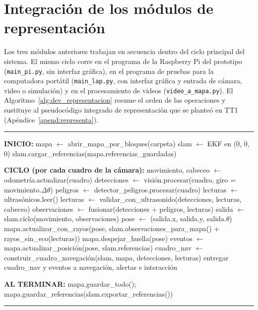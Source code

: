 \section{Integración de los módulos de representación}
\label{sec:dev_integracion}

Los tres módulos anteriores trabajan en secuencia dentro del ciclo principal del
sistema. El mismo ciclo corre en el programa de la Raspberry Pi del prototipo
(\texttt{main\_pi.py}, sin interfaz gráfica), en el programa de pruebas para la
computadora portátil (\texttt{main\_lap.py}, con interfaz gráfica y entrada de cámara,
video o simulación) y en el procesamiento de videos (\texttt{video\_a\_mapa.py}). El
Algoritmo~\ref{alg:dev_representacion} resume el orden de las operaciones y sustituye
al pseudocódigo integrado de representación que se planteó en TT1
(Apéndice~\ref{apend:representa}).

\begin{center}
\label{alg:dev_representacion}
\end{center}
\vspace{-1.8cm}
\rule{\textwidth}{0.4pt}
\vspace{-0.9cm}
\begin{algorithmic}[1]

\Statex \textbf{INICIO:}
\State mapa $\gets$ abrir\_mapa\_por\_bloques(carpeta) 
\State slam $\gets$ EKF en (0, 0, 0)
\State slam.cargar\_referencias(mapa.referencias\_guardadas) 

\Statex
\Statex \textbf{CICLO (por cada cuadro de la cámara):}
\State movimiento, cabeceo $\gets$ odometría.actualizar(cuadro) 
\State detecciones $\gets$ visión.procesar(cuadro, giro = movimiento.$\Delta\theta$)
    \State peligros $\gets$ detector\_peligros.procesar(cuadro)
\EndIf
\State lecturas $\gets$ ultrasónicos.leer()
\State lecturas $\gets$ validar\_con\_ultrasonido(detecciones, lecturas, cabeceo)
\State observaciones $\gets$ fusionar(detecciones + peligros, lecturas)
\State salida $\gets$ slam.ciclo(movimiento, observaciones)
\State pose $\gets$ (salida.x, salida.y, salida.$\theta$)
\State mapa.actualizar\_con\_rayos(pose, slam.observaciones\_para\_mapa() + rayos\_sin\_eco(lecturas))
\State mapa.despejar\_huella(pose)
\State eventos $\gets$ mapa.actualizar\_posición(pose, slam.referencias)
\State cuadro\_nav $\gets$ construir\_cuadro\_navegación(slam, mapa, detecciones, lecturas)
\State entregar cuadro\_nav y eventos a navegación, alertas e interacción

\Statex
\Statex \textbf{AL TERMINAR:}
\State mapa.guardar\_todo();\; mapa.guardar\_referencias(slam.exportar\_referencias())

\end{algorithmic}
\vspace{-0.9cm}
\rule{\textwidth}{0.4pt}

